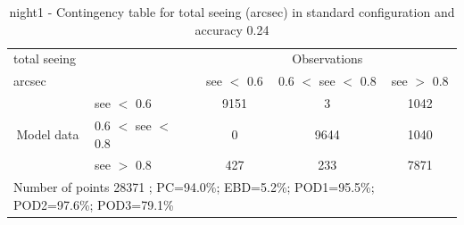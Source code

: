 \begin{table}[p!]
\begin{center}
\begin{tabular}{llccc}
\hline
{total seeing}                                       &                                                    & \multicolumn{3}{c}{Observations}                 \\
{arcsec}                                       &                             & see $<$ 0.6   & 0.6 $<$ see $<$ 0.8 & see $>$ 0.8 \\
\hline
\multicolumn{1}{c}{\multirow{3}{*}{Model data}}  & see $<$ 0.6             & 9151                & 3                       & 1042              \\
                                                 & 0.6  $<$ see $<$ 0.8 & 0                & 9644                       & 1040              \\
                                                 & see $>$ 0.8             & 427                & 233                       & 7871              \\
\hline
\multicolumn{5}{l}{ Number of points        28371 ; PC=94.0\%; EBD=5.2\%; POD1=95.5\%; POD2=97.6\%; POD3=79.1\%}
\end{tabular}
\end{center}
\caption{night1 - Contingency table for  total seeing (arcsec) in standard configuration and accuracy 0.24}
\label{tab:contingencyseeBEF:night1}
\end{table}
